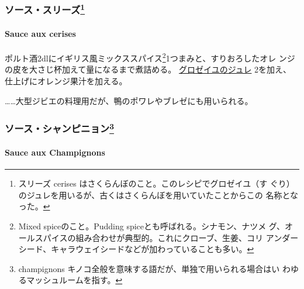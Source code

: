 \begin{recette}
{\subsubsection[ソース・スリーズ]{\texorpdfstring{ソース・スリーズ\footnote{スリーズ
  cerises はさくらんぼのこと。このレシピでグロゼイユ（す
  ぐり）のジュレを用いるが、古くはさくらんぼを用いていたことからこの
  名称となった。}}{ソース・スリーズ}}\label{ux30bdux30fcux30b9ux30b9ux30eaux30fcux30ba6}}

\hypertarget{sauce-aux-cerises}{%
\paragraph{Sauce aux cerises}\label{sauce-aux-cerises}}


ポルト酒2dlにイギリス風ミックススパイス\footnote{Mixed
  spiceのこと。Pudding spiceとも呼ばれる。シナモン、ナツメ
  グ、オールスパイスの組み合わせが典型的。これにクローブ、生姜、コリ
  アンダーシード、キャラウェイシードなどが加わっていることも多い。}1つまみと、すりおろしたオレ
ンジの皮を大さじ\undemi{}杯加えて\deuxtiers{}量になるまで煮詰める。
\protect\hyperlink{}{グロゼイユのジュレ}
2\undemi{}を加え、仕上げにオレンジ果汁を加える。

\ldots{}\ldots{}大型ジビエの料理用だが、鴨のポワレやブレゼにも用いられる。

\maeaki

\hypertarget{ux30bdux30fcux30b9ux30b7ux30e3ux30f3ux30d4ux30cbux30e7ux30f37}{%
\subsubsection[ソース・シャンピニョン]{\texorpdfstring{ソース・シャンピニョン\footnote{champignons
  キノコ全般を意味する語だが、単独で用いられる場合はい
  わゆるマッシュルームを指す。}}{ソース・シャンピニョン}}\label{ux30bdux30fcux30b9ux30b7ux30e3ux30f3ux30d4ux30cbux30e7ux30f37}}

\hypertarget{sauce-aux-champignons}{%
\paragraph{Sauce aux Champignons}\label{sauce-aux-champignons}}



\end{recette}
